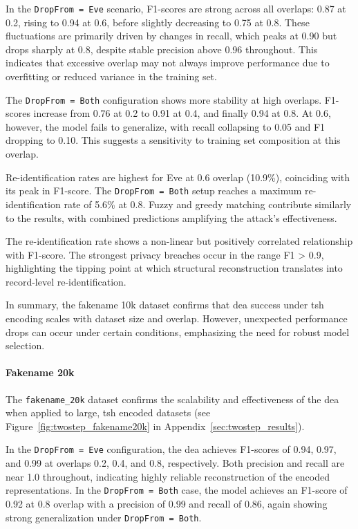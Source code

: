 In the \texttt{DropFrom = Eve} scenario, F1-scores are strong across all overlaps: 0.87 at 0.2, rising to 0.94 at 0.6, before slightly decreasing to 0.75 at 0.8.
These fluctuations are primarily driven by changes in recall, which peaks at 0.90 but drops sharply at 0.8, despite stable precision above 0.96 throughout.
This indicates that excessive overlap may not always improve performance due to overfitting or reduced variance in the training set.

The \texttt{DropFrom = Both} configuration shows more stability at high overlaps.
F1-scores increase from 0.76 at 0.2 to 0.91 at 0.4, and finally 0.94 at 0.8.
At 0.6, however, the model fails to generalize, with recall collapsing to 0.05 and F1 dropping to 0.10.
This suggests a sensitivity to training set composition at this overlap.

Re-identification rates are highest for Eve at 0.6 overlap (10.9\%), coinciding with its peak in F1-score.
The \texttt{DropFrom = Both} setup reaches a maximum re-identification rate of 5.6\% at 0.8.
Fuzzy and greedy matching contribute similarly to the results, with combined predictions amplifying the attack's effectiveness.

The re-identification rate shows a non-linear but positively correlated relationship with F1-score.
The strongest privacy breaches occur in the range F1 > 0.9, highlighting the tipping point at which structural reconstruction translates into record-level re-identification.

In summary, the fakename 10k dataset confirms that \ac{dea} success under \ac{tsh} encoding scales with dataset size and overlap.
However, unexpected performance drops can occur under certain conditions, emphasizing the need for robust model selection.


\paragraph{Fakename 20k}

The \texttt{fakename\_20k} dataset confirms the scalability and effectiveness of the \ac{dea} when applied to large, \ac{tsh} encoded datasets (see Figure~\ref{fig:twostep_fakename20k} in Appendix~\ref{sec:twostep_results}).

In the \texttt{DropFrom = Eve} configuration, the \ac{dea} achieves F1-scores of 0.94, 0.97, and 0.99 at overlaps 0.2, 0.4, and 0.8, respectively.
Both precision and recall are near 1.0 throughout, indicating highly reliable reconstruction of the encoded representations.
In the \texttt{DropFrom = Both} case, the model achieves an F1-score of 0.92 at 0.8 overlap with a precision of 0.99 and recall of 0.86, again showing strong generalization under \texttt{DropFrom = Both}.

